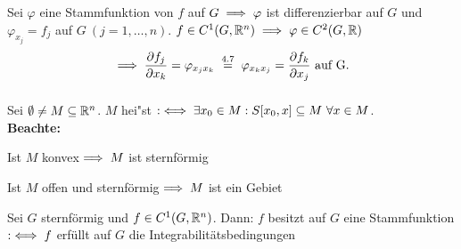 \documentclass[a4paper,twoside,DIV15,BCOR12mm,chapterprefix=true,headings=twolinechapter]{scrbook}
\begin{document}
\begin{beweis}
Sei $\varphi$ eine Stammfunktion von $f$ auf $G\implies\varphi$ ist differenzierbar auf $G$ und $\varphi_{x_j}=f_j$ auf $G\ (j=1,\ldots,n)$. $f\in C^1(G,\mathbb{R}^n)\implies\varphi\in C^2(G,\mathbb{R})$
$$\folgt \frac{\partial f_j}{\partial x_k}=\varphi_{x_jx_k}\gleichnach{4.7}\varphi_{x_kx_j}=\frac{\partial f_k}{\partial x_j}\text{ auf G.}$$ $ $
\end{beweis}

\begin{definition*}
Sei $\emptyset\ne M\subseteq\mathbb{R}^n$. $M$ hei"st  $:\iff\exists x_0\in M: S[x_0,x]\subseteq M\ \forall x\in M$.\\
\textbf{Beachte:}
\begin{liste}
\item Ist $M$ konvex$\implies M$ ist sternförmig
\item Ist $M$ offen und sternförmig$\implies M$ ist ein Gebiet
\end{liste}
\end{definition*}

\begin{satz}
Sei $G$ sternförmig und $f\in C^1(G,\mathbb{R}^n)$. Dann: $f$ besitzt auf $G$ eine Stammfunktion $:\iff f$ erfüllt auf $G$ die Integrabilitätsbedingungen
\end{satz}
\end{document}
